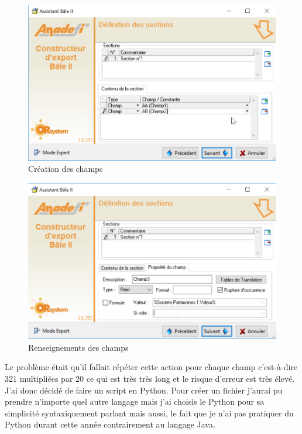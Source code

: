 \begin{figure}[ht]
\centering
\includegraphics[scale=0.6]{resources/champ1.png}
\caption{Création des champs}
\label{champ1}
\end{figure}

\begin{figure}[ht]
\centering
\includegraphics[scale=0.6]{resources/champ2.png}
\caption{Renseignements des champs}
\label{champ2}
\end{figure}

Le problème était qu'il fallait répéter cette action pour chaque champ c'est-à-dire 321 multipliées par 20 ce qui est très très long et le risque d'erreur est très élevé.\\

J'ai donc décidé de faire un script en Python. Pour créer un fichier j'aurai pu prendre n'importe quel autre langage mais j'ai choisis le Python pour sa simplicité syntaxiquement parlant mais aussi, le fait que je n'ai pas pratiquer du Python durant cette année contrairement au langage Java.\\

